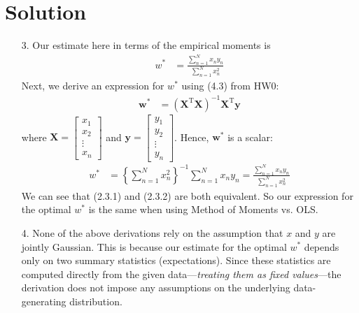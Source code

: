 \documentclass[submit]{../harvardml}
\newenvironment{solution}
  {\color{blue}\section*{Solution}}
{}
\begin{document}
\begin{solution}
\begin{enumerate}
    \item[3.] Our estimate here in terms of the empirical moments is
    \begin{align*}
        w^* &= \frac{\sum_{n=1}^N x_ny_n}{\sum_{n=1}^N x_n^2} \tag*{(2.3.1)}
    \end{align*}
    Next, we derive an expression for $w^*$ using (4.3) from HW0:
    \begin{align*}
        \mathbf{w}^* &= \left(\mathbf{X}^\mathrm{T}\mathbf{X}\right)^{-1}\mathbf{X}^\mathrm{T}\mathbf{y} 
    \end{align*}
    where $\mathbf{X} = \begin{bmatrix}
        x_1 \\ x_2 \\ \vdots \\ x_n
    \end{bmatrix}$ and $\mathbf{y} = \begin{bmatrix}
        y_1 \\ y_2 \\ \vdots \\ y_n
    \end{bmatrix}$. Hence, $\mathbf{w}^*$ is a scalar:
    \begin{align*}
        w^* &= \left\{ \sum_{n=1}^N x_n^2 \right\}^{-1} \sum_{n=1}^{N} x_ny_n = \frac{\sum_{n=1}^N x_ny_n}{\sum_{n=1}^N x_n^2} \tag*{(2.3.2)}
    \end{align*}
    We can see that (2.3.1) and (2.3.2) are both equivalent. So our expression for the optimal $w^*$ is the same when using Method of Moments vs. OLS.

    \item[4.] None of the above derivations rely on the assumption that $x$
and $y$ are jointly Gaussian. This is because our estimate for the optimal $w^*$ depends only on two summary statistics (expectations). Since these statistics are computed directly from the given data---\textit{treating them as fixed values}---the derivation does not impose any assumptions on the underlying data-generating distribution.
\end{enumerate}
\end{solution}
\end{document}
